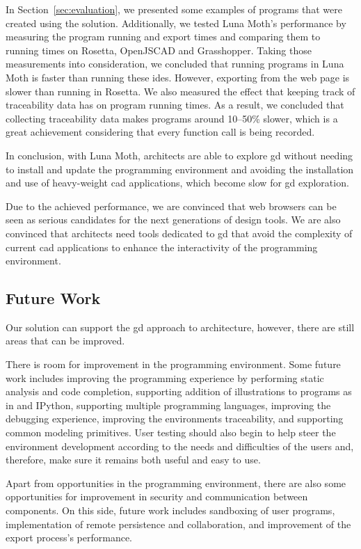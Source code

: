 In Section~\ref{sec:evaluation}, we presented some examples of programs that were created using the solution.
Additionally, we tested Luna Moth's performance by measuring the program running and export times and comparing them to running times on Rosetta, OpenJSCAD and Grasshopper.
Taking those measurements into consideration, we concluded that running programs in Luna Moth is faster than running these \glspl{ide}.
However, exporting from the web page is slower than running in Rosetta.
We also measured the effect that keeping track of traceability data has on program running times.
As a result, we concluded that collecting traceability data makes programs around 10--50\% slower, which is a great achievement considering that every function call is being recorded.

In conclusion, with Luna Moth, architects are able to explore \gls{gd} without needing to install and update the programming environment and avoiding the installation and use of heavy-weight \gls{cad} applications, which become slow for \gls{gd} exploration.

Due to the achieved performance, we are convinced that web browsers can be seen as serious candidates for the next generations of design tools.
We are also convinced that architects need tools dedicated to \gls{gd} that avoid the complexity of current \gls{cad} applications to enhance the interactivity of the programming environment.

\subsection{Future Work}
Our solution can support the \gls{gd} approach to architecture, however, there are still areas that can be improved.

There is room for improvement in the programming environment.
Some future work includes improving the programming experience by performing static analysis and code completion, supporting addition of illustrations to programs as in \cite{Leitao2014illustrated} and IPython, supporting multiple programming languages, improving the debugging experience, improving the environments traceability, and supporting common modeling primitives.
User testing should also begin to help steer the environment development according to the needs and difficulties of the users and, therefore, make sure it remains both useful and easy to use.

Apart from opportunities in the programming environment, there are also some opportunities for improvement in security and communication between components.
On this side, future work includes sandboxing of user programs, implementation of remote persistence and collaboration, and improvement of the export process's performance.
